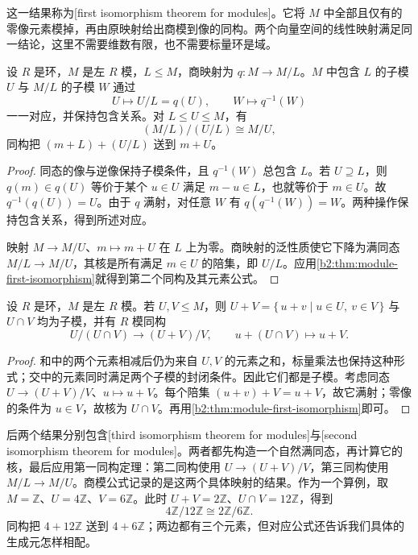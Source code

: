 这一结果称为[first isomorphism theorem for modules]。它将 \(M\) 中全部且仅有的零像元素模掉，再由原映射给出商模到像的同构。两个向量空间的线性映射满足同一结论，这里不需要维数有限，也不需要标量环是域。

\begin{theorem}[子模对应与商的同构]\label{b2:thm:module-correspondence}
	设 \(R\) 是环，\(M\) 是左 \(R\) 模，\(L\le M\)，商映射为 \(q:M\to M/L\)。\(M\) 中包含 \(L\) 的子模 \(U\) 与 \(M/L\) 的子模 \(W\) 通过
	\[
		U\longmapsto U/L=q(U),\qquad W\longmapsto q^{-1}(W)
	\]
	一一对应，并保持包含关系。对 \(L\le U\le M\)，有
	\[
		(M/L)/(U/L)\cong M/U,
	\]
	同构把 \((m+L)+(U/L)\) 送到 \(m+U\)。
\end{theorem}
\begin{proof}
	同态的像与逆像保持子模条件，且 \(q^{-1}(W)\) 总包含 \(L\)。若 \(U\supseteq L\)，则 \(q(m)\in q(U)\) 等价于某个 \(u\in U\) 满足 \(m-u\in L\)，也就等价于 \(m\in U\)。故 \(q^{-1}(q(U))=U\)。由于 \(q\) 满射，对任意 \(W\) 有 \(q(q^{-1}(W))=W\)。两种操作保持包含关系，得到所述对应。

	映射 \(M\to M/U\)、\(m\mapsto m+U\) 在 \(L\) 上为零。商映射的泛性质使它下降为满同态 \(M/L\to M/U\)，其核是所有满足 \(m\in U\) 的陪集，即 \(U/L\)。应用\cref{b2:thm:module-first-isomorphism}就得到第二个同构及其元素公式。
\end{proof}

\begin{theorem}[第二同构]\label{b2:thm:module-second-isomorphism}
	设 \(R\) 是环，\(M\) 是左 \(R\) 模。若 \(U,V\le M\)，则 \(U+V=\{\,u+v\mid u\in U,\ v\in V\,\}\) 与 \(U\cap V\) 均为子模，并有 \(R\) 模同构
	\[
		U/(U\cap V)\longrightarrow(U+V)/V,\qquad u+(U\cap V)\longmapsto u+V.
	\]
\end{theorem}
\begin{proof}
	和中的两个元素相减后仍为来自 \(U,V\) 的元素之和，标量乘法也保持这种形式；交中的元素同时满足两个子模的封闭条件。因此它们都是子模。考虑同态 \(U\to(U+V)/V\)、\(u\mapsto u+V\)。每个陪集 \((u+v)+V=u+V\)，故它满射；零像的条件为 \(u\in V\)，故核为 \(U\cap V\)。再用\cref{b2:thm:module-first-isomorphism}即可。
\end{proof}

后两个结果分别包含[third isomorphism theorem for modules]与[second isomorphism theorem for modules]。两者都先构造一个自然满同态，再计算它的核，最后应用第一同构定理：第二同构使用 \(U\to(U+V)/V\)，第三同构使用 \(M/L\to M/U\)。商模公式记录的是这两个具体映射的结果。作为一个算例，取 \(M=\mathbb Z\)、\(U=4\mathbb Z\)、\(V=6\mathbb Z\)。此时 \(U+V=2\mathbb Z\)、\(U\cap V=12\mathbb Z\)，得到
\[
	4\mathbb Z/12\mathbb Z\cong2\mathbb Z/6\mathbb Z.
\]
同构把 \(4+12\mathbb Z\) 送到 \(4+6\mathbb Z\)；两边都有三个元素，但对应公式还告诉我们具体的生成元怎样相配。
